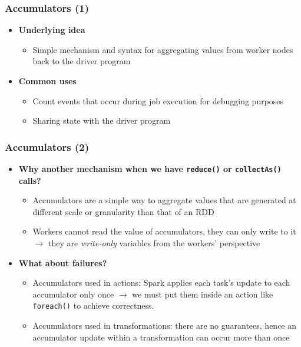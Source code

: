 

\begin{frame}\frametitle{Accumulators (1)}
\begin{itemize}
	\item {\bf Underlying idea}
	\begin{itemize}
		\item Simple mechanism and syntax for aggregating values from worker nodes back to the driver program
	\end{itemize}

	\item {\bf Common uses}
	\begin{itemize}
		\item Count events that occur during job execution for debugging purposes
		\item Sharing state with the driver program
	\end{itemize}
\end{itemize}
\end{frame}

\begin{frame}\frametitle{Accumulators (2)}
\begin{itemize}
	\item {\bf Why another mechanism when we have \texttt{reduce()} or \texttt{collectAs()} calls?}
	\begin{itemize}
		\item Accumulators are a simple way to aggregate values that are generated at different scale or granularity than that of an RDD
		\item Workers cannot read the value of accumulators, they can only write to it $\to$ they are \emph{write-only} variables from the workers' perspective
	\end{itemize}

	\item {\bf What about failures?}
	\begin{itemize}
		\item Accumulators used in actions: Spark applies each task's update to each accumulator only once $\to$ we must put them inside an action like \texttt{foreach()} to achieve correctness.
		\item Accumulators used in transformations: there are no guarantees, hence an accumulator update within a transformation can occur more than once
	\end{itemize}
\end{itemize}
\end{frame}


